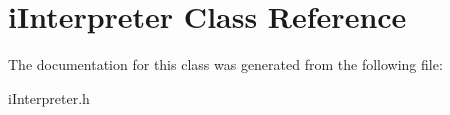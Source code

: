 \hypertarget{classiInterpreter}{
\section{iInterpreter Class Reference}
\label{classiInterpreter}
}


The documentation for this class was generated from the following file:\begin{DoxyCompactItemize}
\item 
iInterpreter.h\end{DoxyCompactItemize}
